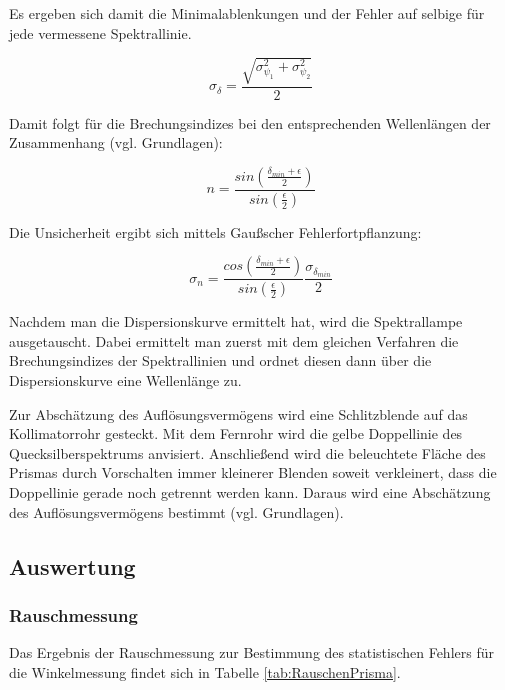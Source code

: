 \documentclass[12pt,a4paper]{article}
\begin{document}
	Es ergeben sich damit die Minimalablenkungen und der Fehler auf selbige für jede vermessene Spektrallinie.
	
	\begin{equation}
	\sigma_{\delta} = \frac{\sqrt{\sigma_{\psi_1}^2+\sigma_{\psi_2}^2}}{2}
	\end{equation}
	
	Damit folgt für die Brechungsindizes bei den entsprechenden Wellenlängen der Zusammenhang (vgl. Grundlagen):
	
	\begin{equation}
	n = \frac{sin(\frac{\delta_{min}+\epsilon}{2})}{sin(\frac{\epsilon}{2})}
	\end{equation}
	
	Die Unsicherheit ergibt sich mittels Gaußscher Fehlerfortpflanzung:
	
	\begin{equation}
	\sigma_n = \frac{cos(\frac{\delta_{min}+\epsilon}{2})}{sin(\frac{\epsilon}{2})} \frac{\sigma_{\delta_{min}}}{2}
	\end{equation}

Nachdem man die Dispersionskurve ermittelt hat, wird die Spektrallampe ausgetauscht. 
Dabei ermittelt man zuerst mit dem gleichen Verfahren die Brechungsindizes der Spektrallinien und ordnet diesen dann über die Dispersionskurve eine Wellenlänge zu.
	
Zur Abschätzung des Auflösungsvermögens wird eine Schlitzblende auf das Kollimatorrohr gesteckt. Mit dem Fernrohr wird die gelbe Doppellinie des Quecksilberspektrums anvisiert.  Anschließend wird die beleuchtete Fläche des Prismas durch Vorschalten immer kleinerer Blenden soweit verkleinert, dass die Doppellinie gerade noch getrennt werden kann. Daraus wird eine Abschätzung des Auflösungsvermögens bestimmt (vgl. Grundlagen). 
	
	
	\subsection{Auswertung}
	
	\subsubsection{Rauschmessung}
	
	Das Ergebnis der Rauschmessung zur Bestimmung des statistischen Fehlers für die Winkelmessung findet sich in Tabelle \ref{tab:RauschenPrisma}.
	
\end{document}
